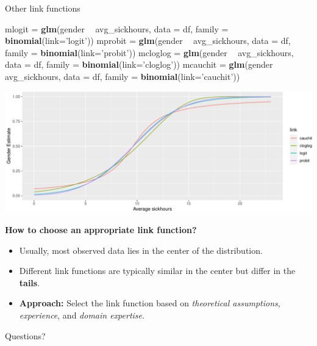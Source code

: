 \documentclass[
  ignorenonframetext,
]{beamer}
\newenvironment{Shaded}{\begin{snugshade}}{\end{snugshade}}
\newcommand{\DataTypeTok}[1]{\textcolor[rgb]{0.13,0.29,0.53}{#1}}
\newcommand{\KeywordTok}[1]{\textcolor[rgb]{0.13,0.29,0.53}{\textbf{#1}}}
\newcommand{\NormalTok}[1]{#1}
\newcommand{\OperatorTok}[1]{\textcolor[rgb]{0.81,0.36,0.00}{\textbf{#1}}}
\newcommand{\StringTok}[1]{\textcolor[rgb]{0.31,0.60,0.02}{#1}}
\providecommand{\tightlist}{%
  \setlength{\itemsep}{0pt}\setlength{\parskip}{0pt}}
\begin{document}
\begin{frame}[fragile]{Other link functions}
\protect\hypertarget{other-link-functions}{}

\tiny

\begin{Shaded}
\begin{Highlighting}[]
\NormalTok{mlogit    =}\StringTok{ }\KeywordTok{glm}\NormalTok{(gender }\OperatorTok{~}\StringTok{ }\NormalTok{avg_sickhours, }\DataTypeTok{data =}\NormalTok{ df, }\DataTypeTok{family =} \KeywordTok{binomial}\NormalTok{(}\DataTypeTok{link=}\StringTok{'logit'}\NormalTok{))}
\NormalTok{mprobit   =}\StringTok{ }\KeywordTok{glm}\NormalTok{(gender }\OperatorTok{~}\StringTok{ }\NormalTok{avg_sickhours, }\DataTypeTok{data =}\NormalTok{ df, }\DataTypeTok{family =} \KeywordTok{binomial}\NormalTok{(}\DataTypeTok{link=}\StringTok{'probit'}\NormalTok{))}
\NormalTok{mcloglog  =}\StringTok{ }\KeywordTok{glm}\NormalTok{(gender }\OperatorTok{~}\StringTok{ }\NormalTok{avg_sickhours, }\DataTypeTok{data =}\NormalTok{ df, }\DataTypeTok{family =} \KeywordTok{binomial}\NormalTok{(}\DataTypeTok{link=}\StringTok{'cloglog'}\NormalTok{))}
\NormalTok{mcauchit  =}\StringTok{ }\KeywordTok{glm}\NormalTok{(gender }\OperatorTok{~}\StringTok{ }\NormalTok{avg_sickhours, }\DataTypeTok{data =}\NormalTok{ df, }\DataTypeTok{family =} \KeywordTok{binomial}\NormalTok{(}\DataTypeTok{link=}\StringTok{'cauchit'}\NormalTok{))}
\end{Highlighting}
\end{Shaded}

\normalsize

\tiny\includegraphics{Schmitt_Marvin_binary_response_files/figure-beamer/unnamed-chunk-27-1.pdf}
\normalsize

\end{frame}

\begin{frame}

\textbf{How to choose an appropriate link function?}

\begin{itemize}
\tightlist
\item
  Usually, most observed data lies in the center of the distribution.
\item
  Different link functions are typically similar in the center but
  differ in the \textbf{tails}.
\item
  \textbf{Approach:} Select the link function based on \emph{theoretical
  assumptions}, \emph{experience}, and \emph{domain expertise}.
\end{itemize}

\end{frame}

\begin{frame}{Questions?}
\protect\hypertarget{questions}{}

\end{frame}
\end{document}
